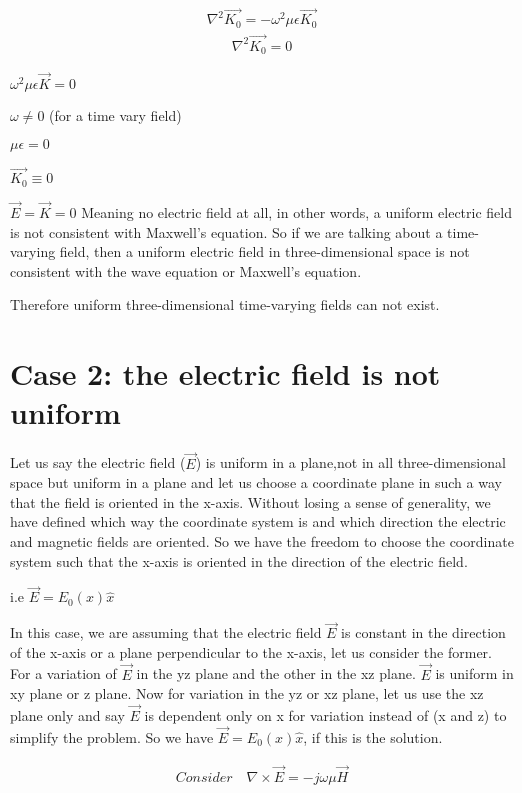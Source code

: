 \begin{align}
\nabla^2\vec{K_{0}}=-\omega^2\mu\epsilon\vec{K_{0}}
\end{align}
\begin{align}
\nabla^2\vec{K_{0}}=0
\end{align}

$\omega^2\mu\epsilon\vec{K}=0$

$\omega\neq0$ (for a time vary field)

$\mu\epsilon=0$

$\vec{K_{0}}\equiv0$

$\vec{E}=\vec{K}=0$ Meaning no electric field at all, in other words, a uniform electric field is not consistent with Maxwell's equation. So if we are talking about a time-varying field, then a uniform electric field in three-dimensional space is not consistent with the wave equation or Maxwell's equation.

Therefore uniform three-dimensional time-varying fields can not exist.

\section{Case 2: the electric field is not uniform}
Let us say the electric field ($\vec{E}$) is uniform in a plane,not  in all three-dimensional space but uniform in a plane and let us choose a coordinate plane in such a way that the field is oriented in the x-axis. Without losing a sense of generality, we have defined which way the coordinate system is and which direction the electric and magnetic fields are oriented. So we have the freedom to choose the coordinate system such that the x-axis is oriented in the direction of the electric field.

i.e $\vec{E}={E_{0}}(x)\hat{x}$

In this case, we are assuming that the electric field $\vec{E}$ is constant in the direction of the x-axis or a plane perpendicular to the x-axis, let us consider the former. For a variation of $\vec{E}$ in the yz plane and the other in the xz plane. $\vec{E}$ is uniform in xy plane or z plane. Now for variation in the yz or xz plane, let us use the xz plane only and say $\vec{E}$ is dependent only on x for variation instead of (x and z) to simplify the problem. So we have $\vec{E}={E_{0}(x)}\hat{x}$, if this is the solution.

\begin{align}
Consider\quad\nabla\times\vec{E}=-j\omega\mu\vec{H}
\end{align}


